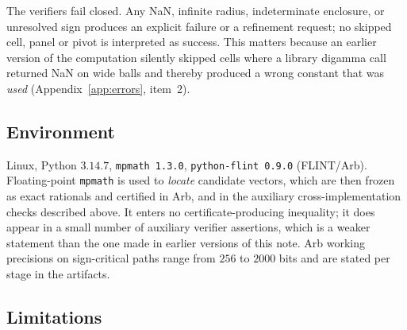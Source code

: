 \documentclass[11pt,a4paper]{article}
\theoremstyle{definition}
\theoremstyle{remark}
\newcommand{\src}[1]{{\footnotesize\texttt{#1}}}
\begin{document}
The verifiers fail closed. Any NaN, infinite radius, indeterminate enclosure, or
unresolved sign produces an explicit failure or a refinement request; no skipped
cell, panel or pivot is interpreted as success. This matters because an earlier
version of the computation silently skipped cells where a library digamma call
returned NaN on wide balls and thereby produced a wrong constant that was
\emph{used} (Appendix~\ref{app:errors}, item~2).

\subsection{Environment}

Linux, Python $3.14.7$, \src{mpmath 1.3.0}, \src{python-flint 0.9.0} (FLINT/Arb).
Floating-point \src{mpmath} is used to \emph{locate} candidate vectors, which
are then frozen as exact rationals and certified in Arb, and in the auxiliary
cross-implementation checks described above. It enters no
certificate-producing inequality; it does appear in a small number of auxiliary
verifier assertions, which is a weaker statement than the one made in earlier
versions of this note. Arb working precisions on sign-critical paths range from
$256$ to $2000$ bits and are stated per stage in the artifacts.

\subsection{Limitations}
\end{document}
